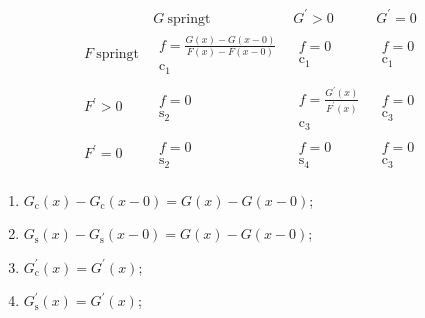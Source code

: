 \begin{solution}

\begin{align*}
    \begin{array}{c|c|c|c}
                           & G ~\text{springt}~                                                                     & G^\prime > 0                                                                   & G^\prime = 0                                     \\ \hline
        F ~\text{springt}~ & \begin{matrix} f = \frac{G(x) - G(x - 0)}{F(x) - F(x - 0)} \\ \mathrm c_1 \end{matrix} & \begin{matrix} f = 0 \\ \mathrm c_1 \end{matrix}                               & \begin{matrix} f = 0 \\ \mathrm c_1 \end{matrix} \\ \hline
        F^\prime > 0       & \begin{matrix} f = 0 \\ \mathrm s_2 \end{matrix}                                       & \begin{matrix} f = \frac{G^\prime(x)}{F^\prime(x)} \\ \mathrm c_3 \end{matrix} & \begin{matrix} f = 0 \\ \mathrm c_3 \end{matrix} \\ \hline
        F^\prime = 0       & \begin{matrix} f = 0 \\ \mathrm s_2 \end{matrix}                                       & \begin{matrix} f = 0 \\ \mathrm s_4 \end{matrix}                               & \begin{matrix} f = 0 \\ \mathrm c_3 \end{matrix}
    \end{array}
\end{align*}

\begin{enumerate}[label = \arabic*.]
    \item $G_\mathrm{c}(x) - G_\mathrm{c}(x - 0) = G(x) - G(x - 0)$;
    \item $G_\mathrm{s}(x) - G_\mathrm{s}(x - 0) = G(x) - G(x - 0)$;
    \item $G_\mathrm{c}^\prime(x) = G^\prime(x)$;
    \item $G_\mathrm{s}^\prime(x) = G^\prime(x)$;
\end{enumerate}


\end{solution}
